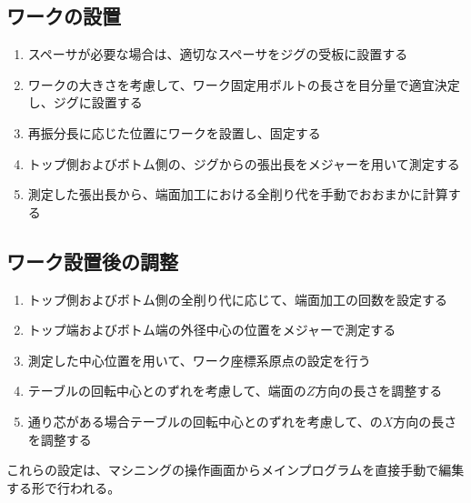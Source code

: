 \subsection{ワークの設置}
\begin{enumerate}
\item {}スペーサが必要な場合は、適切なスペーサをジグの受板に設置する
\item {}ワークの大きさを考慮して、ワーク固定用ボルトの長さを目分量で適宜決定し、ジグに設置する
\item {}再振分長に応じた位置にワークを設置し、固定する
\item トップ側およびボトム側の、ジグからの張出長をメジャーを用いて測定する
\item 測定した張出長から、端面加工における全削り代を手動でおおまかに計算する
\end{enumerate}


\subsection{ワーク設置後の調整}
\begin{enumerate}
\item トップ側およびボトム側の全削り代に応じて、端面加工の回数を設定する
\item トップ端およびボトム端の外径中心の位置をメジャーで測定する
\item 測定した中心位置を用いて、ワーク座標系原点の設定を行う
\item {}テーブルの回転中心とのずれを考慮して、端面の$Z$方向の長さを調整する
\item {}通り芯がある場合テーブルの回転中心とのずれを考慮して、の$X$方向の長さを調整する
\end{enumerate}
これらの設定は、マシニングの操作画面からメインプログラムを直接手動で編集する形で行われる。



